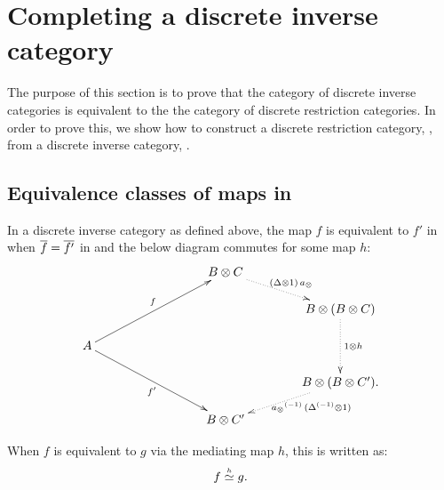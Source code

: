




\section{Completing a discrete inverse category} %
\label{sec:completing_a_discrete_inverse_category}

The purpose of this section is to prove that the category of discrete inverse categories is
equivalent to the the category of discrete restriction categories. In order to prove this, we show
how to construct a discrete restriction category, \Xt, from a discrete inverse category, \X.

\subsection{Equivalence classes of maps in \hypX} %
\label{sub:equivalence_classes_of_maps_in_hypx}


\begin{definition}\label{defn:xequivalence}
  In a discrete inverse category \X as defined above, the map $f$ is equivalent to $f'$ in \X when
  $\overline{f} = \overline{f'}$ in \X and the below diagram commutes for some map $h$:
  \[
    \xymatrix @C=40pt @R=15pt{
      & & B \* C \ar@{.>}[dr]^{(\Delta\* 1) \, a_{\*}}\\
      && & B \* (B\* C) \ar@{.>}[dd]^{1\* h} \\
      A \ar[uurr]^f \ar[ddrr]_{f'}&&&\\
      && & B \* (B \* C'). \ar@{.>}[dl]^(.4){\ \inv{a_{\*}}\,(\inv{\Delta}\* 1)}\\
      && B\* C'
    }
  \]
\end{definition}

\begin{notation}
  When $f$ is equivalent to $g$ via the mediating map $h$, this is written as:
  \[
    f\overset{\scriptscriptstyle h}{\simeq}g.
  \]
\end{notation}

